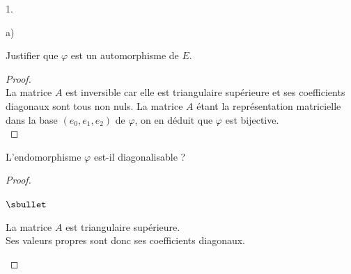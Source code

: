 \documentclass[11pt]{article}%
\begin{document}
\begin{noliste}{1.}
\begin{noliste}{a)}
  \item Justifier que $\varphi$ est un automorphisme de $E$.

    \begin{proof}~\\
      La matrice $A$ est inversible car elle est triangulaire
      supérieure et ses coefficients diagonaux sont tous non
      nuls. La matrice $A$ étant la représentation matricielle dans la
      base $(e_0, e_1, e_2)$ de $\varphi$, on en déduit que $\varphi$
      est bijective.%
      ~\\[-1.2cm]
    \end{proof}

  \item L'endomorphisme $\varphi$ est-il diagonalisable ?

    \begin{proof}~%
      \begin{noliste}{$\sbullet$}
      \item La matrice $A$ est triangulaire supérieure. \\
        Ses valeurs propres sont donc ses coefficients diagonaux.%


\end{noliste}
\end{proof}
\end{noliste}
\end{noliste}
\end{document}
